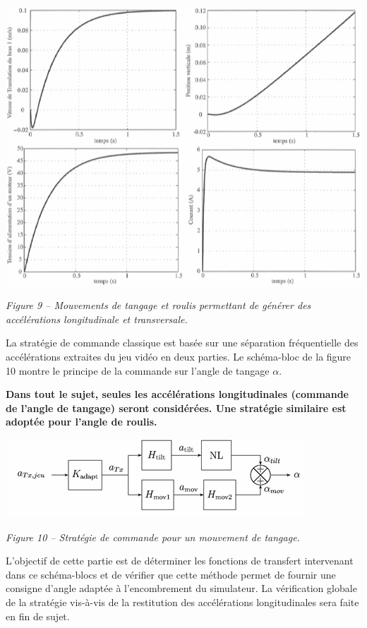 \documentclass[10pt,fleqn]{article} %
\begin{document}
\begin{center}
\includegraphics[width=.9\linewidth]{images/fig_09}

\textit{Figure 9 -- Mouvements de tangage et roulis permettant de générer des accélérations longitudinale et transversale.}
\end{center}

La stratégie de commande classique est basée sur une séparation fréquentielle des accélérations extraites du jeu vidéo en deux parties. 
Le schéma-bloc de la figure 10%
montre le principe de la commande sur l'angle de tangage $\alpha$. 

\textbf{Dans tout le sujet, seules les accélérations longitudinales (commande de l'angle de tangage) seront considérées. Une stratégie similaire est adoptée pour l'angle de roulis.}

\begin{center}
\includegraphics[width=.9\linewidth]{images/fig_10}

\textit{Figure 10 -- Stratégie de commande pour un mouvement de tangage.}
\end{center}

\begin{obj}
L'objectif de cette partie est de déterminer les fonctions de transfert intervenant dans ce schéma-blocs et de vérifier que cette méthode permet de fournir une consigne d'angle adaptée à l'encombrement du simulateur. La vérification globale de la stratégie vis-à-vis de la restitution des accélérations longitudinales sera faite en fin de sujet. 
\end{obj}
\end{document}

